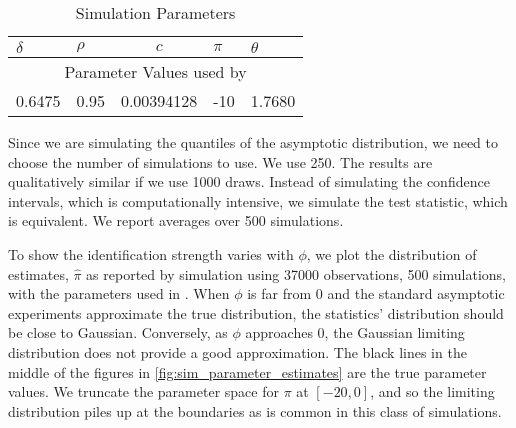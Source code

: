 \documentclass[11pt, letterpaper, twoside]{article}
\begin{document}
\begin{table}[htb]
 
 \centering
 \caption{Simulation Parameters}
 \label{tbl:simulationParameters}
 
 \begin{tabularx}{.65\textwidth}{X X c X X}

  \toprule
  $\delta$ & $\rho$ & $c$ & $\pi$ & $\theta$ \\
  \midrule
  \multicolumn{5}{c}{Parameter Values used by \textcite{han2018leverage}} \\
  \midrule
  0.6475  & 0.95  & \num[scientific-notation=true]{.00394128} & -10 & 1.7680 \\
  \bottomrule
%
 \end{tabularx}

\end{table}


Since we are simulating the quantiles of the asymptotic distribution, we need to choose the number of simulations to use. We use \num{250}. The results are qualitatively similar if we use \num{1000} draws. Instead of simulating the confidence intervals, which is computationally intensive, we simulate the test statistic, which is equivalent.   We report averages over \num{500} simulations.

To show the identification strength varies with $\phi$, we plot the distribution of estimates, $\widehat{\pi}$ as reported by simulation using \num{37000} observations, \num{500} simulations, with the parameters used in \textcite{han2018leverage}. When $\phi$ is far from $0$ and the standard asymptotic experiments approximate the true distribution, the statistics' distribution should be close to Gaussian. Conversely, as $\phi$ approaches $0$, the Gaussian limiting distribution does not provide a good approximation. The black lines in the middle of the figures in \cref{fig:sim_parameter_estimates} are the true parameter values. We truncate the parameter space for $\pi$ at $[-20, 0]$, and so the limiting distribution piles up at the boundaries as is common in this class of simulations.  
\end{document}
